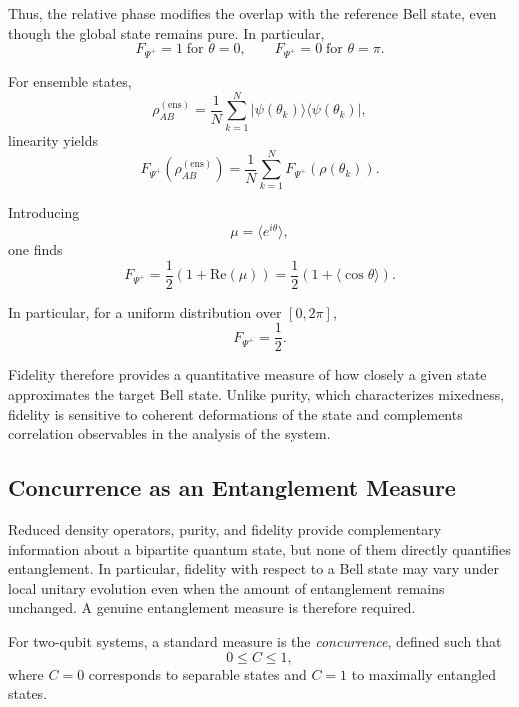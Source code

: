 \documentclass[a4paper]{article}
\begin{document}
\medskip

Thus, the relative phase modifies the overlap with the reference Bell state, even though the global state remains pure. In particular,
\[
F_{\Psi^+} = 1 \;\text{for } \theta = 0,
\qquad
F_{\Psi^+} = 0 \;\text{for } \theta = \pi.
\]

\medskip

For ensemble states,
\[
\rho_{AB}^{(\mathrm{ens})}
=
\frac{1}{N}\sum_{k=1}^{N}
|\psi(\theta_k)\rangle\langle\psi(\theta_k)|,
\]
linearity yields
\[
F_{\Psi^+}(\rho_{AB}^{(\mathrm{ens})})
=
\frac{1}{N}
\sum_{k=1}^{N}
F_{\Psi^+}(\rho(\theta_k)).
\]

Introducing
\[
\mu = \langle e^{i\theta} \rangle,
\]
one finds
\[
F_{\Psi^+}
=
\frac{1}{2}\left(1 + \mathrm{Re}(\mu)\right)
=
\frac{1}{2}\left(1 + \langle \cos\theta \rangle\right).
\]

\medskip

In particular, for a uniform distribution over \( [0,2\pi] \),
\[
F_{\Psi^+} = \frac{1}{2}.
\]

\medskip

Fidelity therefore provides a quantitative measure of how closely a given state approximates the target Bell state. Unlike purity, which characterizes mixedness, fidelity is sensitive to coherent deformations of the state and complements correlation observables in the analysis of the system.


\subsection{Concurrence as an Entanglement Measure}

Reduced density operators, purity, and fidelity provide complementary information about a bipartite quantum state, but none of them directly quantifies entanglement. In particular, fidelity with respect to a Bell state may vary under local unitary evolution even when the amount of entanglement remains unchanged. A genuine entanglement measure is therefore required.

\medskip

For two-qubit systems, a standard measure is the \emph{concurrence}, defined such that
\[
0 \le C \le 1,
\]
where \(C=0\) corresponds to separable states and \(C=1\) to maximally entangled states.
\end{document}
